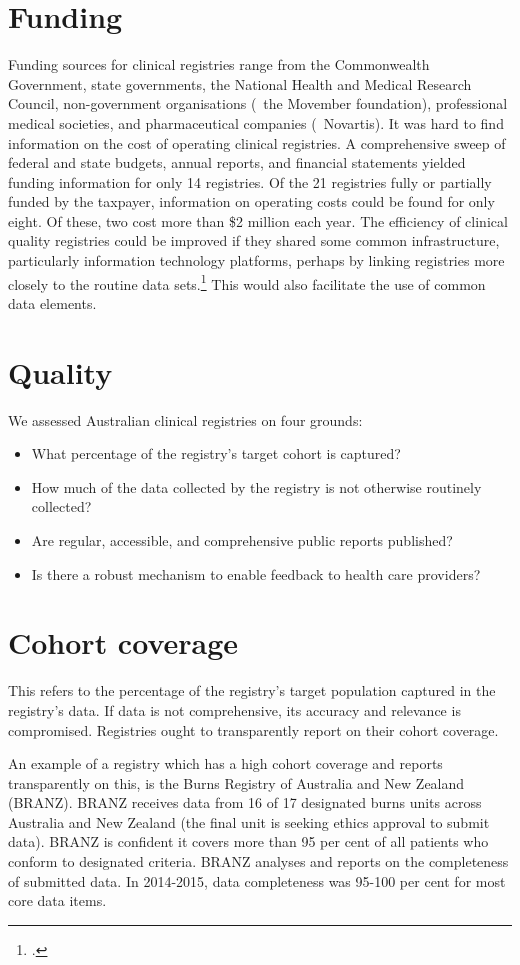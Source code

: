 \documentclass[FrontPage]{grattan}
\begin{document}
\section{Funding}
Funding sources for clinical registries range from the Commonwealth Government, state governments, the National Health and Medical Research Council, non-government organisations (\eg~the Movember foundation), professional medical societies, and pharmaceutical companies (\eg~Novartis). It was hard to find information on the cost of operating clinical registries. A comprehensive sweep of federal and state budgets, annual reports, and financial statements yielded funding information for only 14 registries. Of the 21 registries fully or partially funded by the taxpayer, information on operating costs could be found for only eight. Of these, two cost more than \$2 million each year. The efficiency of clinical quality registries could be improved if they shared some common infrastructure, particularly information technology platforms, perhaps by linking registries more closely to the routine data sets.\footcite{RN122}
This would also facilitate the use of common data elements.

\section{Quality}
We assessed Australian clinical registries on four grounds: 
\begin{itemize}
    \item What percentage of the registry’s target cohort is captured?
    \item How much of the data collected by the registry is not otherwise routinely collected?
    \item Are regular, accessible, and comprehensive public reports published?
    \item Is there a robust mechanism to enable feedback to health care providers?
\end{itemize}

\section{Cohort coverage}
This refers to the percentage of the registry’s target population captured in the registry’s data. If data is not comprehensive, its accuracy and relevance is compromised. Registries ought to transparently report on their cohort coverage. 

An example of a registry which has a high cohort coverage and reports transparently on this, is the Burns Registry of Australia and New Zealand (BRANZ). BRANZ receives data from 16 of 17 designated burns units across Australia and New Zealand (the final unit is seeking ethics approval to submit data). BRANZ is confident it covers more than 95 per cent of all patients who conform to designated criteria. BRANZ analyses and reports on the completeness of submitted data. In 2014-2015, data completeness was 95-100 per cent for most core data items.
\end{document}
